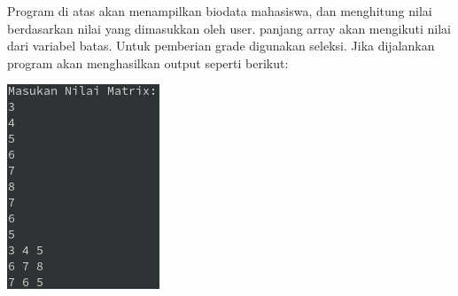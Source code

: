 \documentclass[a4paper,12pt]{article}
\begin{document}
Program di atas akan menampilkan biodata mahasiswa, dan menghitung nilai berdasarkan nilai yang dimasukkan oleh user. panjang array akan mengikuti nilai dari 
variabel batas. Untuk pemberian grade digunakan seleksi. Jika dijalankan program akan menghasilkan output seperti berikut:\\
\begin{center}
    \includegraphics[scale=.7]{7.png}
\end{center}
\end{document}
